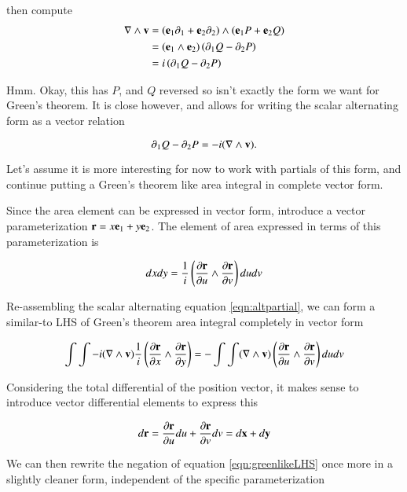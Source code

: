 \documentclass{article}
\newcommand{\grad}[0]{\nabla}
\newcommand{\PD}[2]{\frac{\partial {#2}}{\partial {#1}}}
\begin{document}
then compute
\begin{align*}
\grad \wedge \Bv
&= \left( \Be_1 \partial_1 + \Be_2 \partial_2 \right) \wedge \left( \Be_1 P + \Be_2 Q \right) \\
&= (\Be_{1} \wedge \Be_2) \left( \partial_1 Q - \partial_2 P \right) \\
&= i \left( \partial_1 Q - \partial_2 P \right) \\
\end{align*}

Hmm.  Okay, this has $P$, and $Q$ reversed so isn't exactly the form we want for Green's theorem.  It is close however, and allows for writing the scalar alternating form as a vector relation

\begin{equation}\label{eqn:altpartial}
\partial_1 Q - \partial_2 P = - i(\grad \wedge \Bv).
\end{equation}

Let's assume it is more interesting for now to work with partials of this form, and continue putting a Green's theorem like
area integral in complete vector form.

Since the area element can be expressed in vector form, introduce a vector parameterization $\mathbf{r} = x \mathbf{e}_1 + y \mathbf{e}_2$.  The element
of area expressed in terms of this parameterization is

\begin{equation*}
dx dy = \inv{i}\left( \PD{u}{\Br} \wedge \PD{v}{\Br} \right) du dv
\end{equation*}

Re-assembling the scalar alternating equation \ref{eqn:altpartial}, we can form a similar-to LHS of Green's theorem area integral completely in vector form

\begin{equation}\label{eqn:greenlikeLHS}
\int\int - i(\grad \wedge \Bv) \inv{i}\left( \PD{x}{\Br} \wedge \PD{y}{\Br} \right)
= -\int\int (\grad \wedge \Bv) \left( \PD{u}{\Br} \wedge \PD{v}{\Br} \right) du dv
\end{equation}

Considering the total differential of the position vector, it makes sense to introduce vector differential elements to
express this

\begin{equation*}
d\Br = \PD{u}{\Br} du + \PD{v}{\Br} dv = d\Bx + d\By
\end{equation*}

We can then rewrite the negation of equation \ref{eqn:greenlikeLHS}
once more in a slightly cleaner form, independent of the specific parameterization
\end{document}
